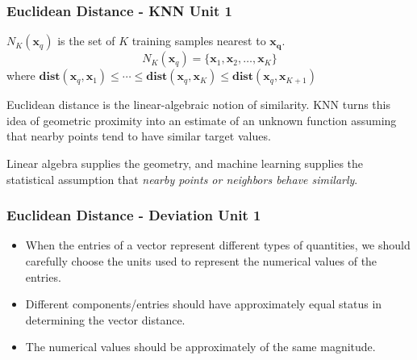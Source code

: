 \documentclass[12pt]{beamer}
\newcommand{\FrameTitle}[2]{\frametitle{#1 \hfill \small\textnormal{\textcolor{midgray}{#2}}}}
\newcommand{\SixPtVspace}{\vspace*{6pt}}
\newcommand{\MVec}[1]{\mathbf{#1}}
\begin{document}
\begin{frame}\FrameTitle{Euclidean Distance - KNN}{Unit 1}
    $N_K(\MVec{x}_q)$ is the set of $K$ training samples nearest to $\MVec{x_q}$.\\

    \[
        N_K(\MVec{x}_q) = \{ \MVec{x}_1, \MVec{x}_2, \ldots, \MVec{x}_K \}
    \]
    where $\mathbf{dist}(\MVec{x}_q, \MVec{x}_1)
        \le \cdots
        \le \mathbf{dist}(\MVec{x}_q, \MVec{x}_K)
        \le \mathbf{dist}(\MVec{x}_q, \MVec{x}_{K+1})$

    \vspace*{2em}
    Euclidean distance is the linear-algebraic notion of similarity.
    KNN turns this idea of geometric proximity into an estimate of
    an unknown function assuming that nearby points tend to have
    similar target values.

    \SixPtVspace
    Linear algebra supplies the geometry, and machine learning supplies
    the statistical assumption that \emph{nearby points or neighbors
    behave similarly}.
\end{frame}


\begin{frame}\FrameTitle{Euclidean Distance - Deviation}{Unit 1}
    \begin{itemize}
        \item When the entries of a vector represent different types of quantities,
            we should carefully choose the units used to represent the numerical
            values of the entries.
        \item  Different components/entries should have approximately equal
                status in determining the vector distance.
        \item The numerical values should be approximately of the same magnitude.
    \end{itemize}
\end{frame}
\end{document}
